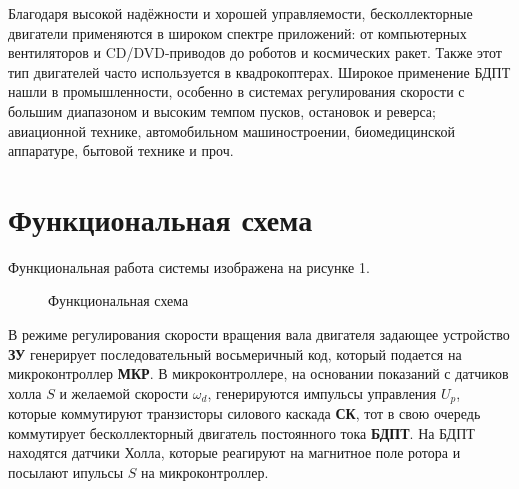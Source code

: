 \documentclass[russian, utf8]{eskdtext}
\begin{document}
Благодаря высокой надёжности и хорошей управляемости, бесколлекторные двигатели применяются в широком спектре приложений: от компьютерных вентиляторов и CD/DVD-приводов до роботов и космических ракет. Также этот тип двигателей часто используется в квадрокоптерах. Широкое применение БДПТ нашли в промышленности, особенно в системах регулирования скорости с большим диапазоном и высоким темпом пусков, остановок и реверса; авиационной технике, автомобильном машиностроении, биомедицинской аппаратуре, бытовой технике и проч. \par

\newpage
\section{Функциональная схема}
Функциональная работа системы изображена на рисунке 1.
\begin{figure} [h!]
	\centering
	\vspace{0.5cm}
	\caption{Функциональная схема}
\end{figure} \par

В режиме регулирования скорости вращения вала двигателя задающее устройство \textbf{ЗУ} генерирует последовательный восьмеричный код, который подается на микроконтроллер \textbf{МКР}. В микроконтроллере, на основании показаний с датчиков холла $S$ и желаемой скорости $\omega_d$, генерируются импульсы управления $U_p$, которые коммутируют транзисторы силового каскада \textbf{СК}, тот в свою очередь коммутирует бесколлекторный двигатель постоянного тока \textbf{БДПТ}. На БДПТ находятся датчики Холла, которые реагируют на магнитное поле ротора и посылают ипульсы $S$ на микроконтроллер. \par
\end{document}
